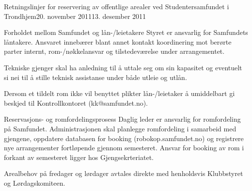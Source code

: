 \documentclass[fsbok.tex]{subfiles}
\begin{document}
\begin{instruks}{Retningslinjer for reservering av offentlige arealer
    ved Studentersamfundet i Trondhjem}{20. november 2011}{13. desember 2011}
\begin{instruksledd}{Forholdet mellom Samfundet og lån-/leietakere}
        Styret er ansvarlig for Samfundets låntakere. Ansvaret innebærer blant annet
        kontakt koordinering mot berørte parter
        internt, rom-/nøkkelansvar og tilstedeværelse under arrangementet.

        Tekniske gjenger skal ha anledning til å uttale seg om sin kapasitet og
        eventuelt si nei til å stille teknisk assistanse
        under både utleie og utlån.

        Dersom et tildelt rom ikke vil benyttet plikter lån-/leietaker å umiddelbart
        gi beskjed til Kontrollkontoret (kk@samfundet.no).
    \end{instruksledd}

    \begin{instruksledd}{Reservasjons- og romfordelingsprosess}
        Daglig leder er ansvarlig for romfordeling på Samfundet. Administrasjonen skal
        planlegge romfordeling i samarbeid
        med gjengene, oppdatere databasen for booking (robokop.samfundet.no) og
        registrere nye arrangementer fortløpende
        gjennom semesteret. Ansvar for booking av rom i forkant av semesteret ligger
        hos Gjengsekrteriatet.


        Arealbehov på fredager og lørdager avtales direkte med henholdsvis Klubbstyret
        og Lørdagskomiteen.


\end{instruksledd}
\end{instruks}
\end{document}
